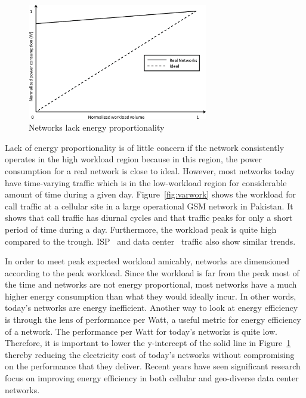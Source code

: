\begin{figure}
\includegraphics[width=0.7\textwidth]{pics/enerprop.eps}
\caption{Networks lack energy proportionality}
\label{fig:ener-prop}
\end{figure} 

Lack of energy proportionality is of little concern if the network consistently operates in the high workload region because in this region, the power consumption for a real network is close to ideal. However, most networks today have time-varying traffic which is in the low-workload region for considerable amount of time during a given day. Figure~\ref{fig:varwork} shows the workload for call traffic at a cellular site in a large operational GSM network in Pakistan. It shows that call traffic has diurnal cycles and that traffic peaks for only a short period of time during a day. Furthermore, the workload peak is quite high compared to the trough. ISP~\cite{1248656} and data center~\cite{10.1109/MC.2007.443} traffic also show similar trends. 

In order to meet peak expected workload amicably, networks are dimensioned according to the peak workload. Since the workload is far from the peak most of the time and networks are not energy proportional, most networks have a much higher energy consumption than what they would ideally incur. In other words, today's networks are energy inefficient. Another way to look at energy efficiency is through the lens of performance per Watt, a useful metric for energy efficiency of a network. The performance per Watt for today's networks is quite low. Therefore, it is important to lower the y-intercept of the solid line in Figure~\ref{fig:ener-prop} thereby reducing the electricity cost of today's networks without compromising on the performance that they deliver. Recent years have seen significant research focus on improving energy efficiency in both cellular and geo-diverse data center networks.

